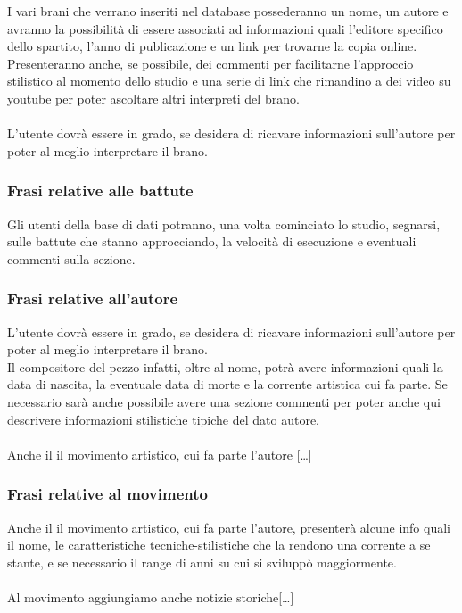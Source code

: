 \documentclass{article}
\begin{document}
    I vari brani che verrano inseriti nel database possederanno un nome, un autore e avranno la possibilità di essere associati ad informazioni quali l'editore specifico dello spartito,
    l'anno di publicazione e un link per trovarne la copia online. Presenteranno anche, se possibile, dei commenti per facilitarne l'approccio stilistico al momento dello studio e una serie
    di link che rimandino a dei video su youtube per poter ascoltare altri interpreti del brano.\\ \\
    L'utente dovrà essere in grado, se desidera di ricavare informazioni sull'autore per poter al meglio interpretare il brano.\\


    \subsubsection{Frasi relative alle battute}

    Gli utenti della base di dati potranno, una volta cominciato lo studio, segnarsi, sulle battute che stanno approcciando, la velocità di esecuzione e eventuali commenti sulla sezione.\\

    \subsubsection{Frasi relative all'autore}

    L'utente dovrà essere in grado, se desidera di ricavare informazioni sull'autore per poter al meglio interpretare il brano.\\
    Il compositore del pezzo infatti, oltre al nome, potrà avere informazioni quali la data di nascita, la eventuale data di morte e la corrente artistica cui fa parte. Se necessario sarà anche
    possibile avere una sezione commenti per poter anche qui descrivere informazioni stilistiche tipiche del dato autore.\\ \\
    Anche il il movimento artistico, cui fa parte l'autore [\dots]\\

    \subsubsection{Frasi relative al movimento}

    Anche il il movimento artistico, cui fa parte l'autore, presenterà alcune info quali il nome, le caratteristiche tecniche-stilistiche che la rendono una corrente a se stante,
    e se necessario il range di anni su cui si sviluppò  maggiormente.\\ \\
    Al movimento aggiungiamo anche notizie storiche[\dots]\\
\end{document}
